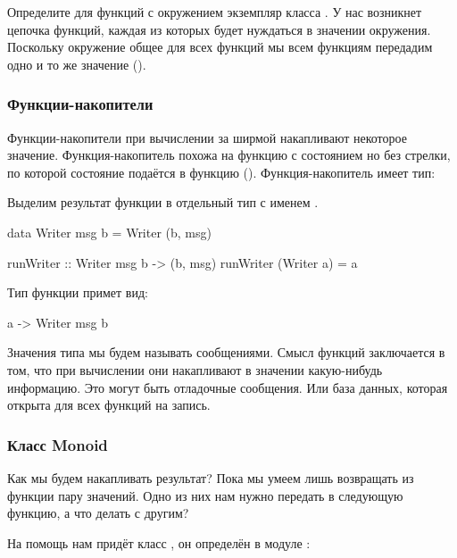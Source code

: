 Определите для функций с окружением экземпляр класса .
У нас возникнет цепочка функций, каждая из которых будет
нуждаться в значении окружения. Поскольку окружение общее для 
всех функций мы всем функциям передадим одно и то же значение
().


\subsubsection{Функции-накопители}

Функции-накопители при вычислении за ширмой накапливают
некоторое значение. Функция-накопитель похожа на 
функцию с состоянием но без стрелки, по которой состояние подаётся
в функцию ().
Функция-накопитель имеет тип: 


Выделим результат функции в отдельный тип с именем . 

\begin{code}
data Writer msg b = Writer (b, msg)

runWriter :: Writer msg b -> (b, msg)
runWriter (Writer a) = a
\end{code}

Тип функции примет вид:

\begin{code}
a -> Writer msg b
\end{code}

Значения типа  мы будем называть сообщениями.
Смысл функций \mbox{} заключается в том, что
при вычислении они накапливают в значении 
какую-нибудь информацию. Это могут быть отладочные сообщения.
Или база данных, которая открыта для всех функций на запись. 

\subsubsection{Класс Monoid}

Как мы будем накапливать результат? Пока мы умеем лишь 
возвращать из функции пару значений. Одно из них нам 
нужно передать в следующую функцию, а что делать с другим? 

На помощь нам придёт класс 
, он определён в
модуле :

